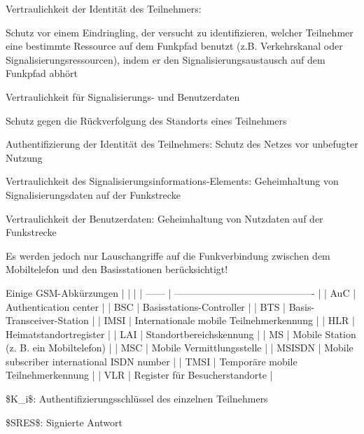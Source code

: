 \documentclass[a4paper]{article}
\begin{document}
\begin{multicols}{3}
\begin{itemize*}
\begin{itemize*}
                  \item Vertraulichkeit der Identität des Teilnehmers:
                  \begin{itemize*}
                        \item Schutz vor einem Eindringling, der versucht zu identifizieren, welcher Teilnehmer eine bestimmte Ressource auf dem Funkpfad benutzt (z.B. Verkehrskanal oder Signalisierungsressourcen), indem er den Signalisierungsaustausch auf dem Funkpfad abhört
                        \item Vertraulichkeit für Signalisierungs- und Benutzerdaten
                        \item Schutz gegen die Rückverfolgung des Standorts eines Teilnehmers
                  \end{itemize*}
                  \item Authentifizierung der Identität des Teilnehmers: Schutz des Netzes vor unbefugter Nutzung
                  \item Vertraulichkeit des Signalisierungsinformations-Elements: Geheimhaltung von Signalisierungsdaten auf der Funkstrecke
                  \item Vertraulichkeit der Benutzerdaten: Geheimhaltung von Nutzdaten auf der Funkstrecke
                  \item Es werden jedoch nur Lauschangriffe auf die Funkverbindung zwischen dem Mobiltelefon und den Basisstationen berücksichtigt!
            \end{itemize*}
      \end{itemize*}

      Einige GSM-Abkürzungen | | | |
      ------ |
      -------------------------------------------
      | | AuC | Authentication center |
      | BSC | Basisstations-Controller | |
      BTS | Basis-Transceiver-Station | | IMSI
      | Internationale mobile Teilnehmerkennung | |
      HLR | Heimatstandortregister | | LAI
      | Standortbereichskennung | | MS |
      Mobile Station (z. B. ein Mobiltelefon) | | MSC
      | Mobile Vermittlungsstelle | | MSISDN
      | Mobile subscriber international ISDN number |
      | TMSI | Temporäre mobile Teilnehmerkennung |
      | VLR | Register für Besucherstandorte |



      \begin{itemize*}
            \item \$K\_i\$: Authentifizierungsschlüssel des einzelnen Teilnehmers
            \item \$SRES\$: Signierte Antwort
      \end{itemize*}


\end{multicols}
\end{document}
